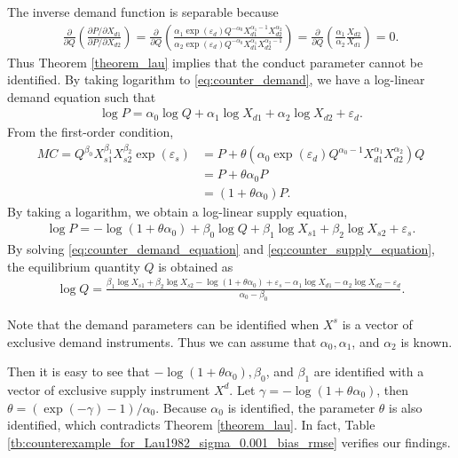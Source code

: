 \documentclass[11pt, a4paper]{article}
\theoremstyle{remark}
\begin{document}
The inverse demand function is separable because
\begin{align}
    \frac{\partial }{\partial Q} \left(\frac{\partial P/\partial X_{d1}}{\partial P/\partial X_{d2}} \right) = \frac{\partial }{\partial Q} \left(\frac{\alpha_{1}\exp(\varepsilon_{d}) Q^{-\alpha_0} X_{d1}^{\alpha_1-1}X_{d2}^{\alpha_2}}{\alpha_2\exp(\varepsilon_{d}) Q^{-\alpha_0} X_{d1}^{\alpha_1}X_{d2}^{\alpha_2-1}} \right) =  \frac{\partial }{\partial Q}\left(\frac{\alpha_1}{\alpha_2} \frac{X_{d2}}{X_{d1}} \right)=0.
\end{align}
Thus Theorem \ref{theorem_lau} implies that the conduct parameter cannot be identified.
By taking logarithm to \eqref{eq:counter_demand}, we have a log-linear demand equation such that 
\begin{align}
    \log P = \alpha_0 \log Q + \alpha_1 \log X_{d1}  + \alpha_2 \log X_{d2} + \varepsilon_{d}.\label{eq:counter_demand_equation}
\end{align}
From the first-order condition, 
\begin{align}
    MC = Q^{\beta_0} X_{s1}^{\beta_1}X_{s2}^{\beta_2}\exp(\varepsilon_{s}) & = P + \theta (\alpha_0 \exp(\varepsilon_{d})Q^{\alpha_0-1}X_{d1}^{\alpha_1}X_{d2}^{\alpha_2}) Q\\
    & = P + \theta \alpha_0 P\\
    &= (1 + \theta\alpha_0) P.
\end{align}
By taking a logarithm, we obtain a log-linear supply equation,
\begin{align}
    \log P = - \log(1 + \theta\alpha_0) + \beta_0 \log Q + \beta_1 \log X_{s1}+\beta_2 \log X_{s2} + \varepsilon_{s}.\label{eq:counter_supply_equation}
\end{align}
By solving \eqref{eq:counter_demand_equation} and \eqref{eq:counter_supply_equation}, the equilibrium quantity $Q$ is obtained as
\begin{align}
    \log Q = \frac{\beta_1 \log X_{s1}+\beta_2 \log X_{s2} - \log(1 + \theta\alpha_0)+ \varepsilon_{s} - \alpha_1 \log X_{d1}  - \alpha_2 \log X_{d2} - \varepsilon_{d} }{\alpha_0 - \beta_0}.
\end{align}

Note that the demand parameters can be identified when $X^s$ is a vector of exclusive demand instruments.
Thus we can assume that $\alpha_0, \alpha_1$, and $\alpha_2$ is known.  

Then it is easy to see that $- \log(1 + \theta\alpha_0), \beta_0$, and $\beta_1$ are identified with a vector of exclusive supply instrument $X^d$.
Let $\gamma = - \log(1 + \theta\alpha_0)$, then $\theta = (\exp(-\gamma) - 1)/\alpha_0$.
Because $\alpha_0$ is identified, the parameter $\theta$ is also identified, which contradicts Theorem \ref{theorem_lau}. In fact, Table \ref{tb:counterexample_for_Lau1982_sigma_0.001_bias_rmse} verifies our findings.
\end{document}
